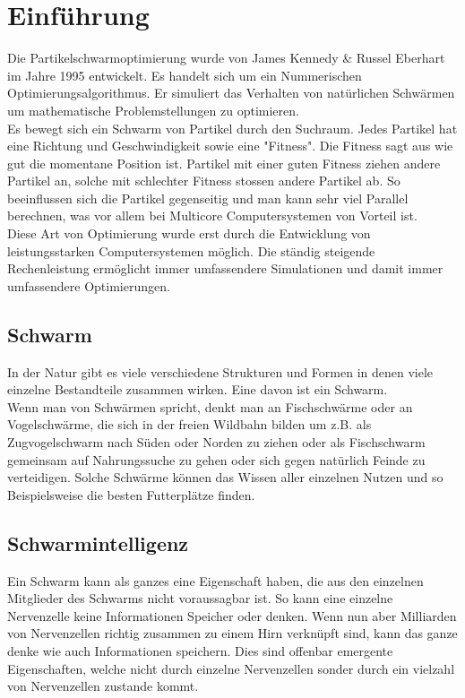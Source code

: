 \section{Einführung}
		Die Partikelschwarmoptimierung wurde von James Kennedy \& Russel Eberhart im Jahre 1995 entwickelt. Es handelt sich um ein Nummerischen Optimierungsalgorithmus. Er simuliert das Verhalten von natürlichen Schwärmen um mathematische Problemstellungen zu optimieren.\\
		Es bewegt sich ein Schwarm von Partikel durch den Suchraum. Jedes Partikel hat eine Richtung und Geschwindigkeit sowie eine "Fitness". Die Fitness sagt aus wie gut die momentane Position ist. Partikel mit einer guten Fitness ziehen andere Partikel an, solche mit schlechter Fitness stossen andere Partikel ab. So beeinflussen sich die Partikel gegenseitig und man kann sehr viel Parallel berechnen, was vor allem bei Multicore Computersystemen von Vorteil ist. \\
		Diese Art von Optimierung wurde erst durch die Entwicklung von leistungsstarken Computersystemen möglich. Die ständig steigende Rechenleistung ermöglicht immer umfassendere Simulationen und damit immer umfassendere Optimierungen.
		\subsection{Schwarm}
		In der Natur gibt es viele verschiedene Strukturen und Formen in denen viele einzelne Bestandteile zusammen wirken. Eine davon ist ein Schwarm.\\
		Wenn man von Schwärmen spricht, denkt man an Fischschwärme oder an Vogelschwärme, die sich in der freien Wildbahn  bilden um z.B. als Zugvogelschwarm nach Süden oder Norden zu ziehen oder als Fischschwarm gemeinsam auf Nahrungssuche zu gehen oder sich gegen natürlich Feinde zu verteidigen. Solche Schwärme können das Wissen aller einzelnen Nutzen und so Beispielsweise die besten Futterplätze finden.
		\subsection{Schwarmintelligenz}
		Ein Schwarm kann als ganzes eine Eigenschaft haben, die aus den einzelnen Mitglieder des Schwarms nicht voraussagbar ist. So kann eine einzelne Nervenzelle keine Informationen Speicher oder denken. Wenn nun aber Milliarden von Nervenzellen richtig zusammen zu einem Hirn verknüpft sind, kann das ganze denke wie auch Informationen speichern. Dies sind offenbar emergente Eigenschaften, welche nicht durch einzelne Nervenzellen sonder durch ein vielzahl von Nervenzellen zustande kommt.
